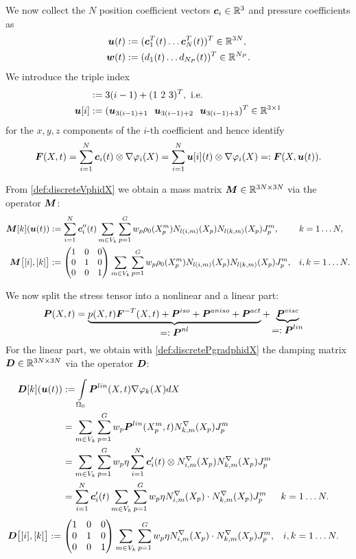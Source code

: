 We now collect the $N$ position coefficient vectors $\boldsymbol{c}_i \in\mathbb{R}^3$ and pressure coefficients as
\begin{align*}
	\boldsymbol{u}(t) &:= (\boldsymbol{c}_1^T(t) \ldots \boldsymbol{c}_N^T(t))^T \in\mathbb{R}^{3N},\\
	\boldsymbol{w}(t) &:= (d_1(t) \ldots d_{N_P}(t))^T \in\mathbb{R}^{N_P}.
\end{align*}
We introduce the triple index
\begin{align}
	[i] &:= 3(i-1)+(1~2~3)^T, \text{ i.e.}\\
	\vu[i] &:= (\vu_{3(i-1)+1}~~\vu_{3(i-1)+2}~~\vu_{3(i-1)+3})^T\in\R^{3\times 1}
\end{align}
for the $x,y,z$ components of the $i$-th coefficient and hence identify
\[
	\boldsymbol{F}(X,t) = \sum\limits_{i=1}^{N} \boldsymbol{c}_i(t)\otimes \nabla\varphi_i(X) = \sum\limits_{i=1}^{N} \boldsymbol{u}[i](t)\otimes \nabla\varphi_i(X) =: \boldsymbol{F}(X,\boldsymbol{u}(t)).
\]

From \eqref{def:discreteVphidX} we obtain a mass matrix $\boldsymbol{M}\in\mathbb{R}^{3N\times 3N}$ via the operator $\boldsymbol{M}$:
\begin{align*}
  \boldsymbol{M}[k](\boldsymbol{u}(t)) &:= \sum\limits_{i=1}^{N} \boldsymbol{c}_i''(t)\sum\limits_{m\in V_k}^{}\sum\limits_{p=1}^{G} w_p \rho_0(X^m_p)N_{l(i,m)}(X_p) N_{l(k,m)}(X_p)J^m_p, && k=1\ldots N,\\
	\boldsymbol{M}\bigl[[i],[k]\bigr] &:= \left(\begin{matrix}1&0&0\\0&1&0\\0&0&1\end{matrix}\right) \sum\limits_{m\in V_k}^{}\sum\limits_{p=1}^{G} w_p \rho_0(X^m_p)N_{l(i,m)}(X_p) N_{l(k,m)}(X_p)J^m_p, && i,k=1\ldots N.
\end{align*}
	
We now split the stress tensor into a nonlinear and a linear part:
\begin{align}
  \vP(X,t) &= \underbrace{p(X,t)\vF^{-T}(X,t) + \vPi + \vPa + \vPf}_{\displaystyle=:\vPnl} + \underbrace{\vPv}_{\displaystyle=:\vPl}
  \label{def:splitPnllin}
\end{align}
For the linear part, we obtain with \eqref{def:discretePgradphidX} the damping matrix $\boldsymbol{D}\in\mathbb{R}^{3N\times 3N}$ via the operator $\boldsymbol{D}$:
\begin{align}
    \boldsymbol{D}[k](\boldsymbol{u}(t))&:=
		\int\limits_{\Omega_0}^{}\boldsymbol{P}^{lin}(X,t)\nabla\varphi_{k}(X) dX \nonumber\\
		&=\sum\limits_{m\in V_k}^{}\sum\limits_{p=1}^{G} w_p\boldsymbol{P}^{lin}(X^m_p,t)N^\nabla_{k,m}(X_p)J^m_p\nonumber\\
		&=\sum\limits_{m\in V_k}^{}\sum\limits_{p=1}^{G} w_p \eta \sum\limits_{i=1}^{N} \boldsymbol{c}_i'(t) \otimes N^\nabla_{i,m}(X_p) N^\nabla_{k,m}(X_p)J^m_p\nonumber\\
		&=\sum\limits_{i=1}^{N} \boldsymbol{c}_i'(t) \sum\limits_{m\in V_k}^{}\sum\limits_{p=1}^{G} w_p \eta N^\nabla_{i,m}(X_p) \cdot N^\nabla_{k,m}(X_p)J^m_p
		&& k=1\ldots N.\label{def:discretePviscgradphidX}
\end{align}
\begin{align*}
	\boldsymbol{D}\bigl[[i],[k]\bigr] &:= \left(\begin{matrix}1&0&0\\0&1&0\\0&0&1\end{matrix}\right) \sum\limits_{m\in V_k}^{}\sum\limits_{p=1}^{G} w_p \eta N^\nabla_{i,m}(X_p) \cdot N^\nabla_{k,m}(X_p) J^m_p, && i,k=1\ldots N.
\end{align*}

